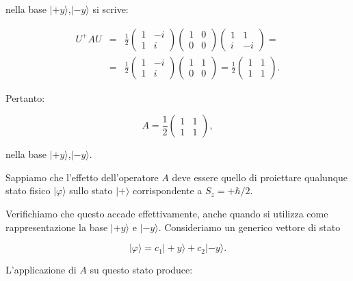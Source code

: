 \documentclass[a4paper,12pt,oneside]{book}
\begin{document}
nella base $| +y \rangle $,$| -y \rangle$ si scrive:

\begin{eqnarray}
U^+AU &=& \frac{1}{2}
\begin{pmatrix}
1 & -i\\
1 & i
\end{pmatrix}
\begin{pmatrix}
1 & 0\\
0 & 0
\end{pmatrix}
\begin{pmatrix}
1 & 1\\
i & -i
\end{pmatrix}= \nonumber \\
&=&\frac{1}{2}
\begin{pmatrix}
1 & -i\\
1 & i
\end{pmatrix}
\begin{pmatrix}
1 & 1\\
0 & 0
\end{pmatrix}=
\frac{1}{2}
\begin{pmatrix}
1 & 1\\
1 & 1
\end{pmatrix} .
\end{eqnarray}

Pertanto:

\begin{equation}
A= \frac{1}{2}
\begin{pmatrix}
1 & 1\\
1 & 1
\end{pmatrix} ,
\end{equation}

nella base $| +y \rangle $,$| -y \rangle $.

Sappiamo che l'effetto dell'operatore $A$ deve essere quello di proiettare qualunque stato fisico $| \varphi \rangle $ sullo stato $| + \rangle $ corrispondente a $S_z=+\hbar/2$.

Verifichiamo che questo accade effettivamente, anche quando si utilizza come rappresentazione la base $| +y \rangle $ e $| -y \rangle $. Consideriamo un generico vettore di stato

\begin{equation}
| \varphi \rangle = c_1 | +y \rangle + c_2| -y \rangle .
\end{equation}


L'applicazione di $A$ su questo stato produce:
\end{document}
